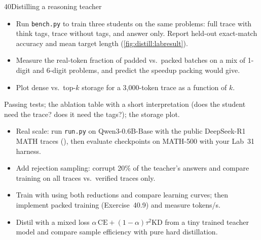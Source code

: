 \begin{labbox}{40}{Distilling a reasoning teacher}
\begin{itemize}
\item Run \texttt{bench.py} to train three students on the same problems: full trace with think
tags, trace without tags, and answer only. Report held-out exact-match accuracy and mean target
length (\cref{fig:distill:labresult}).
\item Measure the real-token fraction of padded vs.\ packed batches on a mix of 1-digit and 6-digit
problems, and predict the speedup packing would give.
\item Plot dense vs.\ top-$k$ storage for a 3{,}000-token trace as a function of $k$.
\end{itemize}

Passing tests; the ablation table with a short interpretation (does the student need the trace?
does it need the tags?); the storage plot.

\begin{itemize}
\item Real scale: run \texttt{run.py} on Qwen3-0.6B-Base with the public DeepSeek-R1 MATH traces
(), then evaluate checkpoints on MATH-500 with your
Lab~31 harness.
\item Add rejection sampling: corrupt 20\% of the teacher's answers and compare training on all
traces vs.\ verified traces only.
\item Train with  using both reductions and compare learning curves; then
implement packed training (Exercise~40.9) and measure tokens/s.
\item Distil with a mixed loss $\alpha\,\text{CE}+(1-\alpha)\tau^2\text{KD}$ from a tiny trained
teacher model and compare sample efficiency with pure hard distillation.
\end{itemize}
\end{labbox}
